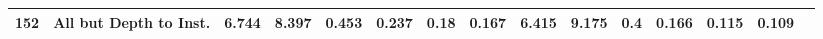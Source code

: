 \begin{table}
\begin{tabular}{@{\hskip3pt}c@{\hskip3pt}c@{\hskip3pt}c@{\hskip3pt}c@{\hskip3pt}c@{\hskip3pt}c@{\hskip3pt}c@{\hskip3pt}c@{\hskip3pt}c@{\hskip3pt}c@{\hskip3pt}c@{\hskip3pt}c@{\hskip3pt}c@{\hskip3pt}c@{\hskip3pt}c}
        152 &         All but Depth to Inst. &             6.744 &          8.397 &           0.453 &           0.237 &            0.18 &           0.167 &               6.415 &         9.175 &             0.4 &           0.166 &           0.115 &           0.109 \\
\bottomrule
\end{tabular}
\end{table}
